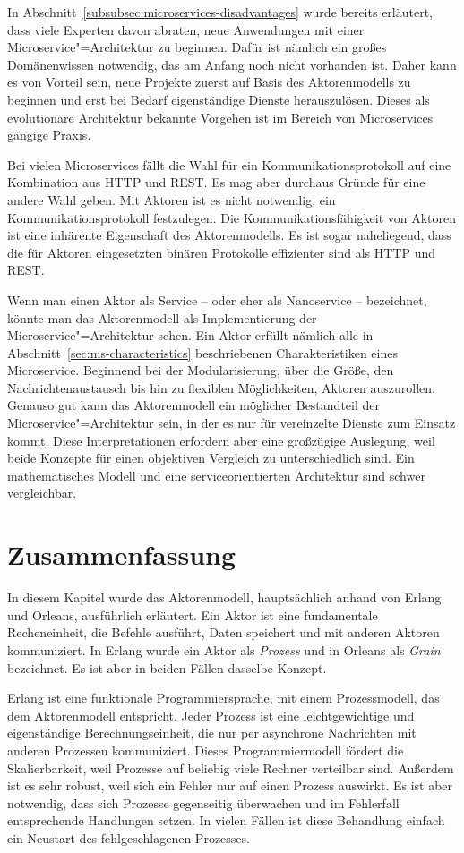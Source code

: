 In Abschnitt~\ref{subsubsec:microservices-disadvantages} wurde bereits erläutert, dass viele Experten davon abraten, neue Anwendungen mit einer Microservice"=Architektur zu beginnen. Dafür ist nämlich ein großes Domänenwissen notwendig, das am Anfang noch nicht vorhanden ist. Daher kann es von Vorteil sein, neue Projekte zuerst auf Basis des Aktorenmodells zu beginnen und erst bei Bedarf eigenständige Dienste herauszulösen. Dieses als evolutionäre Architektur bekannte Vorgehen ist im Bereich von Microservices gängige Praxis. 

Bei vielen Microservices fällt die Wahl für ein Kommunikationsprotokoll auf eine Kombination aus HTTP und REST. Es mag aber durchaus Gründe für eine andere Wahl geben. Mit Aktoren ist es nicht notwendig, ein Kommunikationsprotokoll festzulegen. Die Kommunikationsfähigkeit von Aktoren ist eine inhärente Eigenschaft des Aktorenmodells. Es ist sogar naheliegend, dass die für Aktoren eingesetzten binären Protokolle effizienter sind als HTTP und REST.

Wenn man einen Aktor als Service -- oder eher als Nanoservice -- bezeichnet, könnte man das Aktorenmodell als Implementierung der Microservice"=Architektur sehen. Ein Aktor erfüllt nämlich alle in Abschnitt~\ref{sec:ms-characteristics} beschriebenen Charakteristiken eines Microservice. Beginnend bei der Modularisierung, über die Größe, den Nachrichtenaustausch bis hin zu flexiblen Möglichkeiten, Aktoren auszurollen. Genauso gut kann das Aktorenmodell ein möglicher Bestandteil der Microservice"=Architektur sein, in der es nur für vereinzelte Dienste zum Einsatz kommt. Diese Interpretationen erfordern aber eine großzügige Auslegung, weil beide Konzepte für einen objektiven Vergleich zu unterschiedlich sind. Ein mathematisches Modell und eine serviceorientierten Architektur sind schwer vergleichbar.

\section{Zusammenfassung}

In diesem Kapitel wurde das Aktorenmodell, hauptsächlich anhand von \mbox{Erlang} und Orleans, ausführlich erläutert. Ein Aktor ist eine fundamentale Recheneinheit, die Befehle ausführt, Daten speichert und mit anderen Aktoren kommuniziert. In Erlang wurde ein Aktor als \textit{Prozess} und in Orleans als \textit{Grain} bezeichnet. Es ist aber in beiden Fällen dasselbe Konzept.

Erlang ist eine funktionale Programmiersprache, mit einem Prozessmodell, das dem Aktorenmodell entspricht. Jeder Prozess ist eine leichtgewichtige und eigenständige Berechnungseinheit, die nur per asynchrone Nachrichten mit anderen Prozessen kommuniziert. Dieses Programmiermodell fördert die Skalierbarkeit, weil Prozesse auf beliebig viele Rechner verteilbar sind. Außerdem ist es sehr robust, weil sich ein Fehler nur auf einen Prozess auswirkt. Es ist aber notwendig, dass sich Prozesse gegenseitig überwachen und im Fehlerfall entsprechende Handlungen setzen. In vielen Fällen ist diese Behandlung einfach ein Neustart des fehlgeschlagenen Prozesses.


